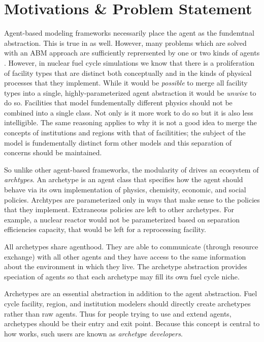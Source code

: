 \section{Motivations \& Problem Statement}

Agent-based modeling frameworks necessarily place the agent as the fundemtnal 
abstraction. This is true in \cyclus as well. However, many problems which are 
solved with an ABM approach are sufficiently reprersented by one or two kinds of 
agents \citeme. However, in nuclear fuel cycle simulations we know that there is
a proliferation of facility types that are distinct both conceptually and in the 
kinds of physical processes that they implement. While it would be \emph{possible}
to merge all facility types into a single, highly-parameterized agent abstraction
it would be \emph{unwise} to do so. Facilities that model fundementally different
physics should not be combined into a single class. Not only is it more work to 
do so but it is also less intelligible. The same reasoning applies to why it is 
not a good idea to merge the concepts of institutions and regions with that of
facilitities; the subject of the model is fundementally distinct form other models
and this separation of concerns should be maintained.

So unlike other agent-based frameworks, the modularity of \cyclus drives 
an ecosystem of \emph{archtypes}. An archetype is an agent class that specifies 
how the agent should behave via its own implementation of physics, chemisity, 
economic, and social policies. Archtypes are parameterized only in ways that 
make sense to the policies that they implement. Extraneous policies are left to 
other archetypes. For example, a nuclear reactor would not be parameterized based 
on separation efficiencies capacity, that would be left for a reprocessing facility.

All archetypes share agenthood. They are able to communicate (through resource 
exchange) with all other agents and they have access to the same information 
about the environment in which they live. The archetype abstraction provides
speciation of agents so that each archetype may fill its own fuel cycle niche.

Archetypes are an essential abstraction in addition to the agent abstraction. 
Fuel cycle facility, region, and institution modelers should directly create
archetypes rather than raw agents. Thus for people trying to use and extend 
\cyclus agents, archetypes should be their entry and exit point. Because this 
concept is central to how \cyclus works, such users are known as \emph{archetype
developers}.


